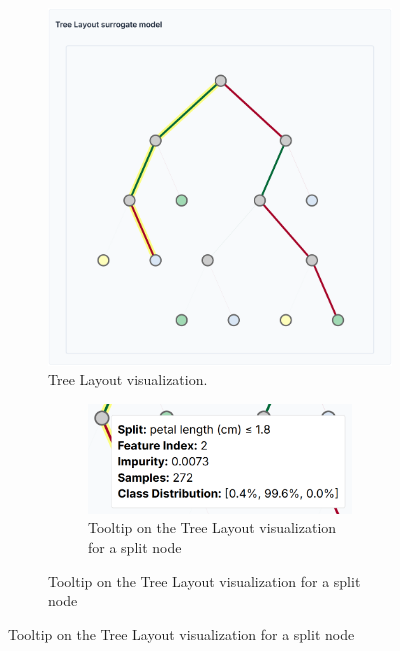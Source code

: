 \begin{figure}[ht!]
    \centering
    \begin{subfigure}[c]{0.68\textwidth}
        \centering
        \includegraphics[width=\linewidth]{images/classicalDecisionTreeFinal.png}
        \caption{Tree Layout visualization.}
        \label{fig:classicDecisionTreeFinal}
    \end{subfigure}%
    \hfill
    \begin{subfigure}[c]{0.28\textwidth}
        \centering
        \begin{subfigure}[c]{\linewidth}
            \centering
            \includegraphics[width=\linewidth]{images/classicalDecisionTreeFinalTooltipSplit.png}
            \caption{Tooltip on the Tree Layout visualization for a split node}

\end{subfigure}
\end{subfigure}
\end{figure}
